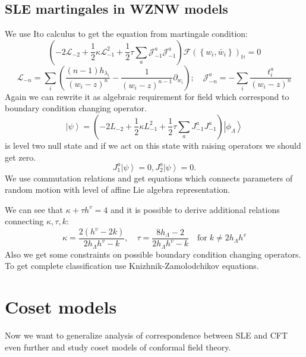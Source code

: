 \documentclass[12pt]{article}
\theoremstyle{definition}
\theoremstyle{definition} \newtheorem{Def}{Definition}
\begin{document}
\subsection{SLE martingales in WZNW models}
We use Ito calculus to get the equation from martingale condition:
\begin{equation*}
  \left(-2 \mathcal{L}_{-2}+\frac{1}{2}\kappa \mathcal{L}_{-1}^{2}+\frac{1}{2}\tau\sum_{a} \mathcal{J}^{a}_{-1} \mathcal{J}^{a}_{-1}\right)        \mathcal{F}(\left\{w_{i}, \bar w_{i}\right\})_{\mathbb{H}}=0
\end{equation*}
\begin{equation*}
  \mathcal{L}_{-n}=\sum_{i}\left(\frac{(n-1)h_{\lambda_{i}}}{(w_{i}-z)^{n}}-\frac{1}{(w_{i}-z)^{n-1}}\partial_{w_{i}}\right);\quad \mathcal{J}^{a}_{{-n}}=-\sum_{i}\frac{t^{a}_{i}}{(w_{i}-z)^{n}}
\end{equation*}
Again we can rewrite it as algebraic requirement for  field  which 
correspond to boundary condition changing operator.
\begin{equation*}
  \left| \psi\right>=\left(-2 L_{-2}+\frac{1}{2}\kappa L_{-1}^{2}+\frac{1}{2}\tau\sum_{a} J^{a}_{-1} J^{a}_{-1}\right) \left|\phi_{\Lambda}\right>    
\end{equation*}
is level two null state and if we act on this state with raising operators we should get zero.
\begin{equation*}
  J^{a}_{1} \left|\psi\right>=0, J^{a}_{2}\left|\psi\right>=0.
\end{equation*}
 We use commutation relations and get equations which connects parameters of random motion with level of affine Lie algebra representation. 

We can see that $\kappa+\tau h^{v}=4$ and it is possible to derive additional relations connecting $\kappa, \tau, k$:
\begin{equation*}
  \kappa=\frac{2(h^{v}-2k)}{2h_{\Lambda}h^{v}-k},\quad \tau=\frac{8 h_{\Lambda}-2}{2h_{\Lambda}h^{v}-k}  \quad\text{for}\; k\neq 2h_{\Lambda}h^{v}
\end{equation*}
 Also we get some constraints on possible boundary condition changing operators. 
To get complete classification use Knizhnik-Zamolodchikov equations.


\section{Coset models}
\label{sec:coset-models}
Now we want to generalize analysis of correspondence between SLE and CFT even further and study coset models of conformal field theory.
\end{document}
